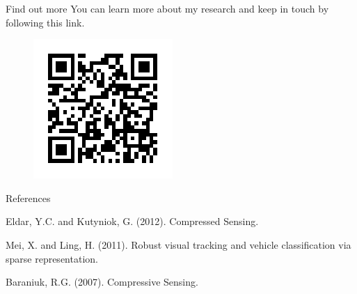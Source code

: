 \documentclass[final]{beamer}
\begin{document}
\begin{frame}{}
\begin{columns}[t]
\begin{column}{0.24\textwidth}
      \vspace{10pt}
      
      \begin{block}{Find out more}
        You can learn more about my research and keep in touch by following this link. 
        \begin{figure}
          \centering
\includegraphics{qr}          
        \end{figure}

      \end{block}

      \begin{block}{References}
				\begin{footnotesize}
				\begin{thebibliography}{10}

Eldar, Y.C. and Kutyniok, G. (2012). Compressed Sensing.

Mei, X. and Ling, H. (2011). Robust visual tracking and vehicle classification via sparse representation.

Baraniuk, R.G. (2007). Compressive Sensing.
\end{thebibliography}

				\end{footnotesize}

\vspace{100pt}
      \end{block}

    \end{column}%

  \end{columns}
\end{frame}
\end{document}
